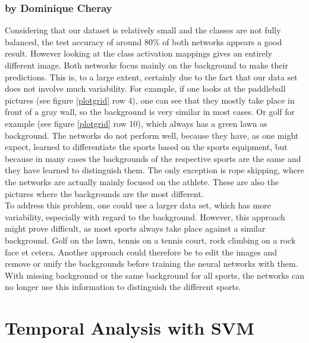 \documentclass[11pt]{report}
\begin{document}
\subsubsection{by Dominique Cheray}
Considering that our dataset is relatively small and the classes are not fully
balanced, the test accuracy of around 80\% of both networks appears a good
result. However looking at the class activation mappings gives an entirely
different image. Both networks focus mainly on the background to make their
predictions. This is, to a large extent, certainly due to the fact that our
data set does not involve much variability. For example, if one looks at the
paddleball pictures (see figure \ref{plotgrid} row 4), one can see that they
mostly take place in front of a gray wall, so the background is very similar in
most cases. Or golf for example (see figure \ref{plotgrid} row 10), which always
has a green lawn as background. The networks do not perform well, because they
have, as one might expect, learned to differentiate the sports based on the
sports equipment, but because in many cases the backgrounds of the respective
sports are the same and they have learned to distinguish them.
The only exception is rope skipping, where the networks are actually mainly
focused on the athlete. These are also the pictures where the backgrounds are
the most different. \\
To address this problem, one could use a larger data set, which has more
variability, especially with regard to the background. However, this approach might prove
difficult, as most sports always take place against a similar background. Golf
on the lawn, tennis on a tennis court, rock climbing on a rock face et cetera.
Another approach could therefore be to edit the images and remove or unify the
backgrounds before training the neural networks with them. With missing
background or the same background for all sports, the networks can no longer use
this information to distinguish the different sports.

\section{Temporal Analysis with SVM}
\end{document}
